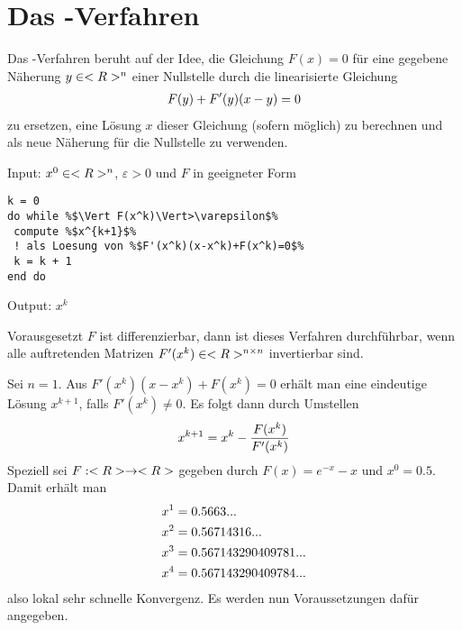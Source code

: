 \section{Das -Verfahren}

Das -Verfahren beruht auf der Idee, die Gleichung $F(x) = 0$ für eine gegebene Näherung $y\in<R>^n$ einer Nullstelle durch die linearisierte Gleichung 
\begin{align}
	F(y) + F'(y)(x-y) = 0\notag
\end{align}
zu ersetzen, eine Lösung $x$ dieser Gleichung (sofern möglich) zu berechnen und als neue Näherung für die Nullstelle zu verwenden.

\begin{algorithm}
	Input: $x^0\in<R>^n$, $\varepsilon>0$ und $F$ in geeigneter Form
	\begin{lstlisting}
k = 0
do while %$\Vert F(x^k)\Vert>\varepsilon$%
 compute %$x^{k+1}$% 
 ! als Loesung von %$F'(x^k)(x-x^k)+F(x^k)=0$%
 k = k + 1
end do
	\end{lstlisting}
	Output: $x ^k$
\end{algorithm}

Vorausgesetzt $F$ ist differenzierbar, dann ist dieses Verfahren durchführbar, wenn alle auftretenden Matrizen $F'(x ^k)\in<R>^{n\times n}$ invertierbar sind.

\begin{example}
	Sei $n=1$. Aus $F'(x^k)(x-x^k)+F(x^k)=0$ erhält man eine eindeutige Lösung $x^{k+1}$, falls $F'(x^k)\neq 0$. Es folgt dann durch Umstellen
	\begin{align}
		x^{k+1} = x^k - \frac{F(x^k)}{F'(x^k)}\notag
	\end{align}
	Speziell sei $F:<R>\to<R>$ gegeben durch $F(x) = e^{-x}-x$ und $x^0=0.5$. Damit erhält man
	\begin{align}
		x^1 &= 0.5663... \notag \\
		x^2 &= 0.56714316... \notag \\
		x^3 &= 0.567143290409781... \notag \\
		x^4 &= 0.567143290409784... \notag
	\end{align}
	also lokal sehr schnelle Konvergenz. Es werden nun Voraussetzungen dafür angegeben.
\end{example}


